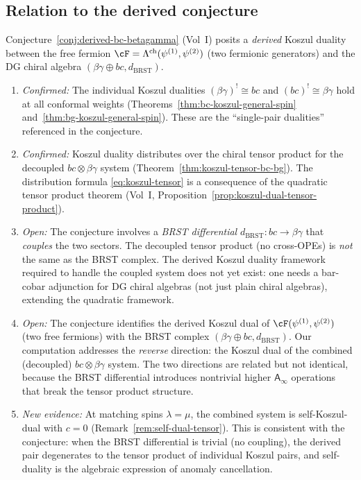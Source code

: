 \documentclass[11pt]{article}
\newcommand{\Ainf}{\mathsf{A}_{\infty}}
\begin{document}
\subsection{Relation to the derived conjecture}

Conjecture~\ref*{conj:derived-bc-betagamma} (Vol~I) posits
a \emph{derived} Koszul duality between the free fermion
$\cF = \Lambda^{\mathrm{ch}}(\psi^{(1)}, \psi^{(2)})$
(two fermionic generators) and the DG chiral algebra
$(\beta\gamma \oplus bc, d_{\mathrm{BRST}})$.

\begin{observation}
\label{obs:derived-conjecture-status}
\mbox{}
\begin{enumerate}
\item \emph{Confirmed:} The individual Koszul dualities
  $(\beta\gamma)^! \cong bc$ and $(bc)^! \cong \beta\gamma$
  hold at all conformal weights (Theorems~\ref{thm:bc-koszul-general-spin}
  and~\ref{thm:bg-koszul-general-spin}).
  These are the ``single-pair dualities'' referenced in the
  conjecture.

\item \emph{Confirmed:} Koszul duality distributes over the
  chiral tensor product for the decoupled $bc \otimes
  \beta\gamma$ system
  (Theorem~\ref{thm:koszul-tensor-bc-bg}).  The distribution
  formula \eqref{eq:koszul-tensor} is a consequence of the
  quadratic tensor product theorem
  (Vol~I, Proposition~\ref*{prop:koszul-dual-tensor-product}).

\item \emph{Open:} The conjecture involves a \emph{BRST
  differential} $d_{\mathrm{BRST}}\colon bc \to \beta\gamma$
  that \emph{couples} the two sectors.  The decoupled tensor
  product (no cross-OPEs) is \emph{not} the same as the BRST
  complex.  The derived Koszul duality framework required to
  handle the coupled system does not yet exist: one needs a
  bar-cobar adjunction for DG chiral algebras (not just plain
  chiral algebras), extending the quadratic framework.

\item \emph{Open:} The conjecture identifies the derived
  Koszul dual of $\cF(\psi^{(1)}, \psi^{(2)})$ (two free
  fermions) with the BRST complex
  $(\beta\gamma \oplus bc, d_{\mathrm{BRST}})$.  Our
  computation addresses the \emph{reverse} direction: the
  Koszul dual of the combined (decoupled) $bc \otimes
  \beta\gamma$ system.  The two directions are related but
  not identical, because the BRST differential introduces
  nontrivial higher $\Ainf$ operations that break the tensor
  product structure.

\item \emph{New evidence:} At matching spins $\lambda = \mu$,
  the combined system is self-Koszul-dual with $c = 0$
  (Remark~\ref{rem:self-dual-tensor}).  This is consistent
  with the conjecture: when the BRST differential is trivial
  (no coupling), the derived pair degenerates to the tensor
  product of individual Koszul pairs, and self-duality is the
  algebraic expression of anomaly cancellation.
\end{enumerate}
\end{observation}
\end{document}
